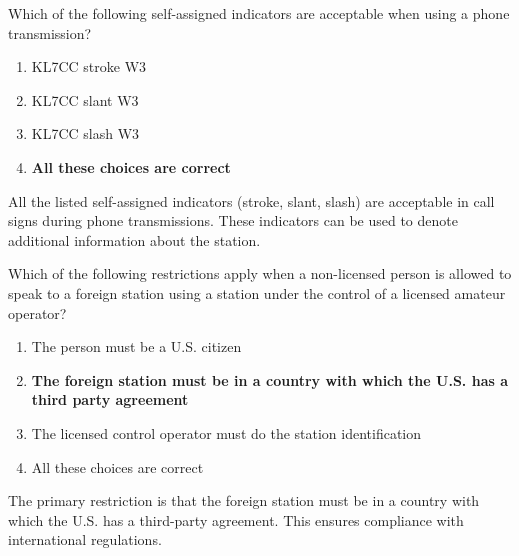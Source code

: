 
\begin{tcolorbox}[colback=gray!10!white,colframe=black!75!black,title={T1F06}]
    Which of the following self-assigned indicators are acceptable when using a phone transmission?
    \begin{enumerate}[label=\Alph*),noitemsep]
        \item KL7CC stroke W3
        \item KL7CC slant W3
        \item KL7CC slash W3
        \item \textbf{All these choices are correct}
    \end{enumerate}
\end{tcolorbox}
All the listed self-assigned indicators (stroke, slant, slash) are acceptable in call signs during phone transmissions. These indicators can be used to denote additional information about the station.


\begin{tcolorbox}[colback=gray!10!white,colframe=black!75!black,title={T1F07}]
    Which of the following restrictions apply when a non-licensed person is allowed to speak to a foreign station using a station under the control of a licensed amateur operator?
    \begin{enumerate}[label=\Alph*),noitemsep]
        \item The person must be a U.S. citizen
        \item \textbf{The foreign station must be in a country with which the U.S. has a third party agreement}
        \item The licensed control operator must do the station identification
        \item All these choices are correct
    \end{enumerate}
\end{tcolorbox}
The primary restriction is that the foreign station must be in a country with which the U.S. has a third-party agreement. This ensures compliance with international regulations.



